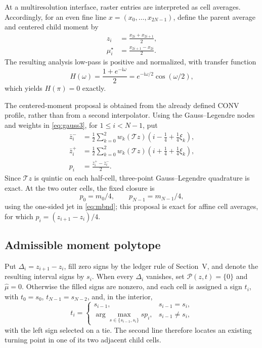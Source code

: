\documentclass[journal]{IEEEtran}
\newcommand{\Tcal}{\mathcal{T}}
\newcommand{\Pcal}{\mathcal{P}}
\begin{document}
At a multiresolution interface, raster entries are interpreted as cell
averages. Accordingly, for an even fine line
\(x=(x_0,\ldots,x_{2N-1})\), define the parent average and centered child
moment by
\begin{align}
 z_i&=\frac{x_{2i}+x_{2i+1}}{2},
 \label{eq:scaleaverage}\\
 \mu_i^\star&=\frac{x_{2i+1}-x_{2i}}{2}.
 \label{eq:actualmoment}
\end{align}
The resulting analysis low-pass is positive and normalized, with transfer
function
\begin{equation}
 H(\omega)=\frac{1+e^{-\mathrm i\omega}}{2}
 =e^{-\mathrm i\omega/2}\cos(\omega/2),
 \label{eq:nyquistresponse}
\end{equation}
which yields \(H(\pi)=0\) exactly.

The centered-moment proposal is obtained from the already defined CONV
profile, rather than from a second interpolator. Using the Gauss--Legendre
nodes and weights in \eqref{eq:gauss3}, for \(1\leq i<N-1\), put
\begin{align}
 \bar z_i^-&=\frac12\sum_{k=0}^{2}w_k
 (\Tcal z)(i-\tfrac14+\tfrac14\xi_k),\nonumber\\
 \bar z_i^+&=\frac12\sum_{k=0}^{2}w_k
 (\Tcal z)(i+\tfrac14+\tfrac14\xi_k),
 \label{eq:halfcells}\\
 p_i&=\frac{\bar z_i^+-\bar z_i^-}{2}.
 \label{eq:momentproposal}
\end{align}
Since \(\Tcal z\) is quintic on each half-cell, three-point Gauss--Legendre
quadrature is exact. At the two outer cells, the fixed closure is
\begin{equation}
 p_0=m_0/4,\qquad p_{N-1}=m_{N-1}/4,
 \label{eq:momentboundary}
\end{equation}
using the one-sided jet in \eqref{eq:mbnd}; this proposal is exact for affine
cell averages, for which \(p_i=(z_{i+1}-z_i)/4\).

\subsection{Admissible moment polytope}

Put \(\Delta_i=z_{i+1}-z_i\), fill zero signs by the ledger rule of
Section~V, and denote the resulting interval signs by \(s_i\). When every
\(\Delta_i\) vanishes, set \(\Pcal(z,t)=\{0\}\) and
\(\widehat\mu=0\). Otherwise the filled signs are nonzero, and each cell is
assigned a sign \(t_i\), with \(t_0=s_0\),
\(t_{N-1}=s_{N-2}\), and, in the interior,
\begin{equation}
 t_i=\begin{cases}
 s_{i-1},&s_{i-1}=s_i,\\
 \arg\max_{s\in\{s_{i-1},s_i\}}sp_i,&s_{i-1}\ne s_i,
 \end{cases}
 \label{eq:momentsign}
\end{equation}
with the left sign selected on a tie. The second line therefore locates an
existing turning point in one of its two adjacent child cells.
\end{document}
